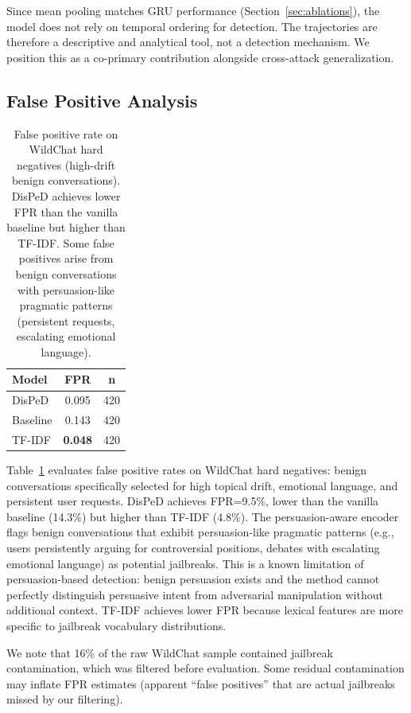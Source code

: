 \documentclass[11pt,a4paper]{article}
\newcommand{\ours}{DisPeD}
\newcommand{\bfres}[1]{\textbf{#1}}
\begin{document}
Since mean pooling matches GRU performance (Section~\ref{sec:ablations}), the model does not rely on temporal ordering for detection. The trajectories are therefore a descriptive and analytical tool, not a detection mechanism. We position this as a co-primary contribution alongside cross-attack generalization.


\subsection{False Positive Analysis}

\begin{table}[t]
\centering
\small
\begin{tabular}{lcc}
\toprule
\textbf{Model} & \textbf{FPR} & \textbf{n} \\
\midrule
\ours{} & 0.095 & 420 \\
Baseline & 0.143 & 420 \\
TF-IDF & \bfres{0.048} & 420 \\
\bottomrule
\end{tabular}
\caption{False positive rate on WildChat hard negatives (high-drift benign conversations). \ours{} achieves lower FPR than the vanilla baseline but higher than TF-IDF. Some false positives arise from benign conversations with persuasion-like pragmatic patterns (persistent requests, escalating emotional language).}
\label{tab:wildchat}
\end{table}

Table~\ref{tab:wildchat} evaluates false positive rates on WildChat hard negatives: benign conversations specifically selected for high topical drift, emotional language, and persistent user requests. \ours{} achieves FPR=9.5\%, lower than the vanilla baseline (14.3\%) but higher than TF-IDF (4.8\%). The persuasion-aware encoder flags benign conversations that exhibit persuasion-like pragmatic patterns (e.g., users persistently arguing for controversial positions, debates with escalating emotional language) as potential jailbreaks. This is a known limitation of persuasion-based detection: benign persuasion exists and the method cannot perfectly distinguish persuasive intent from adversarial manipulation without additional context. TF-IDF achieves lower FPR because lexical features are more specific to jailbreak vocabulary distributions.

We note that 16\% of the raw WildChat sample contained jailbreak contamination, which was filtered before evaluation. Some residual contamination may inflate FPR estimates (apparent ``false positives'' that are actual jailbreaks missed by our filtering).
\end{document}
